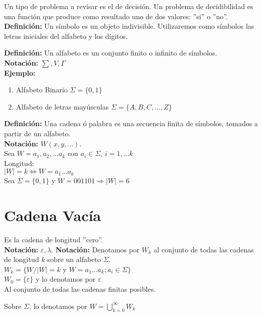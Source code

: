 Un tipo de problema a revisar es el de decisión. Un problema de decidibilidad es una función que produce como resultado uno de dos valores: ''si'' o ''no''.\\

\textbf{Definición: }Un símbolo es un objeto indivisible. Utilizaremos como símbolos las letras iniciales del alfabeto y los dígitos.

\textbf{Definición: }Un alfabeto es un conjunto finito o infinito de símbolos.\\
\textbf{Notación: }$\sum , V,\Gamma$\\

\textbf{Ejemplo: }
\begin{enumerate}
\item Alfabeto Binario $\Sigma = \lbrace 0,1\rbrace$
\item Alfabeto de letras mayúsculas $\Sigma =\lbrace A,B,C,...,Z\rbrace$
\end{enumerate}

\textbf{Definición: }Una cadena ó palabra es una secuencia finita de símbolos, tomados a partir de un alfabeto.\\
\textbf{Notación: } $W (x,y,...)$.\\
Sea $W=a_1,a_2,...a_k$ con $a_i \in \Sigma$, $i=1,...k$\\
Longitud:\\
$|W|=k \Leftrightarrow W=a_1...a_k$\\
Sea $\Sigma=\lbrace 0,1 \rbrace$ y $W=001101 \Rightarrow |W|=6$

\section{Cadena Vacía}

Es la cadena de longitud ''cero''.\\
\textbf{Notación: }$\varepsilon, \lambda$.
\textbf{Notación: }Denotamos por $W_k$ al conjunto de todas las cadenas de longitud $k$ sobre un alfabeto $\Sigma$.\\

$W_k=\lbrace W/|W|=k$ y $W=a_1...a_k; a_i\in \Sigma \rbrace$\\

$W_0=\lbrace \varepsilon \rbrace $ y lo denotamos por $\varepsilon$ \\ %
Al conjunto de todas las cadenas finitas posibles.

Sobre $\Sigma$, lo denotamos por $W= \bigcup_{k=0}^\infty W_k$

